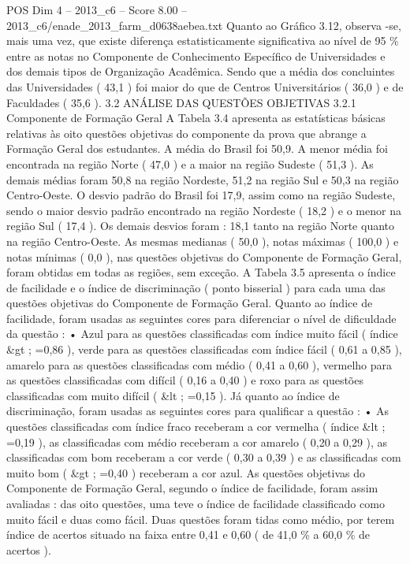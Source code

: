 \begin{textsample}{POS Dim 4 – 2013\_c6 – Score 8.00 – 2013\_c6/enade\_2013\_farm\_d0638aebea.txt}
Quanto ao Gráfico 3.12, observa -se, mais uma vez, que existe diferença estatisticamente significativa ao nível de 95 \% entre as notas no Componente de Conhecimento Específico de Universidades e dos demais tipos de Organização Acadêmica.
Sendo que a média dos concluintes das Universidades ( 43,1 ) foi maior do que de Centros Universitários ( 36,0 ) e de Faculdades ( 35,6 ). 3.2 ANÁLISE DAS QUESTÕES OBJETIVAS 3.2.1 Componente de Formação Geral A Tabela 3.4 apresenta as estatísticas básicas relativas às oito questões objetivas do componente da prova que abrange a Formação Geral dos estudantes.
A média do Brasil foi 50,9.
A menor média foi encontrada na região Norte ( 47,0 ) e a maior na região Sudeste ( 51,3 ).
As demais médias foram 50,8 na região Nordeste, 51,2 na região Sul e 50,3 na região Centro-Oeste.
O desvio padrão do Brasil foi 17,9, assim como na região Sudeste, sendo o maior desvio padrão encontrado na região Nordeste ( 18,2 ) e o menor na região Sul ( 17,4 ).
Os demais desvios foram : 18,1 tanto na região Norte quanto na região Centro-Oeste.
As mesmas medianas ( 50,0 ), notas máximas ( 100,0 ) e notas mínimas ( 0,0 ), nas questões objetivas do Componente de Formação Geral, foram obtidas em todas as regiões, sem exceção.
A Tabela 3.5 apresenta o índice de facilidade e o índice de discriminação ( ponto bisserial ) para cada uma das questões objetivas do Componente de Formação Geral.
Quanto ao índice de facilidade, foram usadas as seguintes cores para diferenciar o nível de dificuldade da questão : • Azul para as questões classificadas com índice muito fácil ( índice \&gt ; =0,86 ), verde para as questões classificadas com índice fácil ( 0,61 a 0,85 ), amarelo para as questões classificadas com médio ( 0,41 a 0,60 ), vermelho para as questões classificadas com difícil ( 0,16 a 0,40 ) e roxo para as questões classificadas com muito difícil ( \&lt ; =0,15 ).
Já quanto ao índice de discriminação, foram usadas as seguintes cores para qualificar a questão : • As questões classificadas com índice fraco receberam a cor vermelha ( índice \&lt ; =0,19 ), as classificadas com médio receberam a cor amarelo ( 0,20 a 0,29 ), as classificadas com bom receberam a cor verde ( 0,30 a 0,39 ) e as classificadas com muito bom ( \&gt ; =0,40 ) receberam a cor azul.
As questões objetivas do Componente de Formação Geral, segundo o índice de facilidade, foram assim avaliadas : das oito questões, uma teve o índice de facilidade classificado como muito fácil e duas como fácil.
Duas questões foram tidas como médio, por terem índice de acertos situado na faixa entre 0,41 e 0,60 ( de 41,0 \% a 60,0 \% de acertos ).

\end{textsample}
